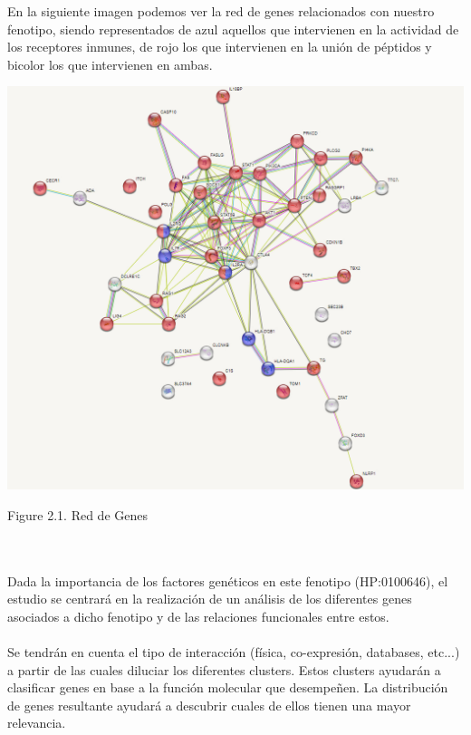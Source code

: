 En la siguiente imagen podemos ver la red de genes relacionados con nuestro fenotipo, siendo representados de azul aquellos que intervienen en la actividad de los receptores inmunes, de rojo los que intervienen en la unión de péptidos y bicolor los que intervienen en ambas.
\begin{center}
 
    \includegraphics[scale=0.4]{figures/red de genes.png}
    
    Figure 2.1. Red de Genes
\end{center}
\\ \\
Dada la importancia de los factores genéticos en este fenotipo (HP:0100646), el estudio se centrará en la realización de un análisis de los diferentes genes asociados a dicho fenotipo y de las relaciones funcionales entre estos. 
\\ \\  \newpage 
Se tendrán en cuenta el tipo de interacción (física, co-expresión, databases, etc...) a partir de las cuales diluciar los diferentes clusters. Estos clusters ayudarán a clasificar genes en base a la función molecular que desempeñen. La distribución de genes resultante ayudará a descubrir cuales de ellos tienen una mayor relevancia.
\\ \\




